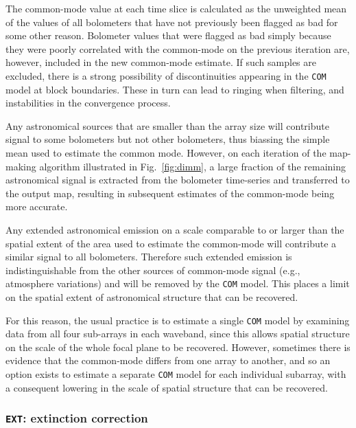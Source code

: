 \documentclass[useAMS,usenatbib,nofootinbib]{mn2e}
\newcommand{\model}[1]{\texttt{#1}}
\begin{document}
The common-mode value at each time slice is calculated as the
unweighted mean of the values of all bolometers that have not
previously been flagged as bad for some other reason. Bolometer values
that were flagged as bad simply because they were poorly correlated
with the common-mode on the previous iteration are, however, included
in the new common-mode estimate. If such samples are excluded, there
is a strong possibility of discontinuities appearing in the
\model{COM} model at block boundaries.  These in turn can lead to
ringing when filtering, and instabilities in the convergence process.

Any astronomical sources that are smaller than the array size will
contribute signal to some bolometers but not other bolometers, thus
biassing the simple mean used to estimate the common mode. However, on
each iteration of the map-making algorithm illustrated in
Fig.~\ref{fig:dimm}, a large fraction of the remaining astronomical
signal is extracted from the bolometer time-series and transferred to the
output map, resulting in subsequent estimates of the common-mode being
more accurate.

Any extended astronomical emission on a scale comparable to or larger
than the spatial extent of the area used to estimate the common-mode
will contribute a similar signal to all bolometers. Therefore such
extended emission is indistinguishable from the other sources of
common-mode signal (e.g., atmosphere variations) and will be removed
by the \model{COM} model. This places a limit on the spatial extent of
astronomical structure that can be recovered.

For this reason, the usual practice is to estimate a single
\model{COM} model by examining data from all four sub-arrays in each
waveband, since this allows spatial structure on the scale of the
whole focal plane to be recovered. However, sometimes there is
evidence that the common-mode differs from one array to another, and
so an option exists to estimate a separate \model{COM} model for each
individual subarray, with a consequent lowering in the scale of
spatial structure that can be recovered.

\subsubsection{\model{EXT}: extinction correction}
\label{sec:ext}
\end{document}
